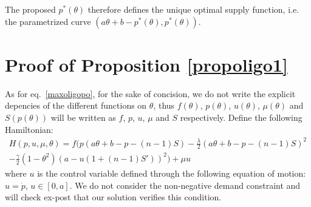 \begin{subappendices}
The proposed $p^*(\theta)$ therefore defines the unique optimal supply function, i.e. the parametrized curve $(a \theta +b-p^*(\theta),p^*(\theta))$.

\section{Proof of Proposition \ref{propoligo1} \label{annex1}}
As for eq.~\ref{maxoligopo}, for the sake of concision, we do not write the explicit depencies of the different functions on $\theta$, thus $f(\theta)$, $p(\theta)$, $u(\theta)$, $\mu(\theta)$ and $S(p(\theta))$ will be written as $f$, $p$, $u$, $\mu$ and $S$ respectively. Define the following Hamiltonian: 
\begin{equation}
\begin{split}
H(p,u,\mu,\theta)= f\bigg( p(a\theta+b-p-(n-1)S)-\frac{\lambda}{2}(a\theta+b-p-(n-1)S)^2\\
-\frac{\gamma}{2}(1-\theta^2)\left(a-u(1+(n-1)S')\right)^2\bigg)+\mu u
\end{split}
\end{equation}
where $u$ is the control variable defined through the following equation of motion: $u=\dot{p}$, $u\in[0,a]$. We do not consider the non-negative demand constraint and will check ex-post that our solution verifies this condition. \\


\end{subappendices}
